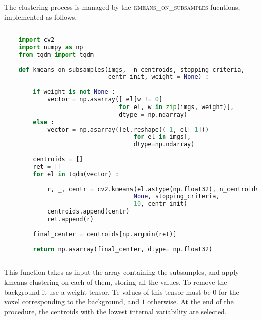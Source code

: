 \documentclass{standalone}
\begin{document}
	The clustering process is managed by the \textsc{kmeans\_on\_subsamples} fucntions, implemented as follows. 
	\lstset{style=python}
	\begin{lstlisting}[language=python, caption=kmenas\_on\_subsamples, label=code:kmeans]
		
	import cv2
	import numpy as np
	from tqdm import tqdm
		
	def kmeans_on_subsamples(imgs,  n_centroids, stopping_criteria, 
							 centr_init, weight = None) :
		
		if weight is not None :
			vector = np.asarray([ el[w != 0] 
								for el, w in zip(imgs, weight)], 
								dtype = np.ndarray)
		else :
			vector = np.asarray([el.reshape((-1, el[-1])) 
									for el in imgs], 
									dtype=np.ndarray)
		
		centroids = []
		ret = []
		for el in tqdm(vector) :
		
			r, _, centr = cv2.kmeans(el.astype(np.float32), n_centroids, 
									None, stopping_criteria, 
									10, centr_init)				
			centroids.append(centr)
			ret.append(r)
			
		final_center = centroids[np.argmin(ret)]
		
		return np.asarray(final_center, dtype= np.float32)
		
	\end{lstlisting}


	This function takes as input the array containing the subsamples, and apply kmeans clustering on each of them, storing all the values.
	To remove the background it use a weight tensor. Te values of this tensor must be $0$ for the voxel corresponding to the background, and $1$ otherwise. 
	At the end of the procedure, the centroids with the lowest internal variability are selected.



	
	
	
\end{document}
